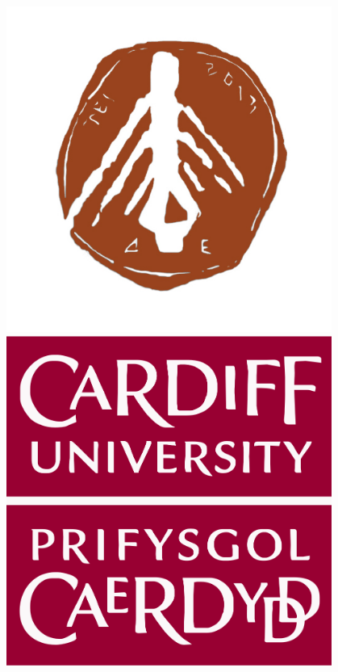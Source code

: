 \documentclass{beamer}
\begin{document}
\begin{frame}
\begin{center}
\begin{columns}
    \begin{column}{.3\textwidth}
    \includegraphics[width=0.8\textwidth]{static/tei_patras.png}\vspace{2pt}
    \includegraphics[width=0.8\textwidth]{static/cardiff_uni_logo.jpg}
    \end{column}
    \end{columns}
    \end{center}
\end{frame}
\end{document}
